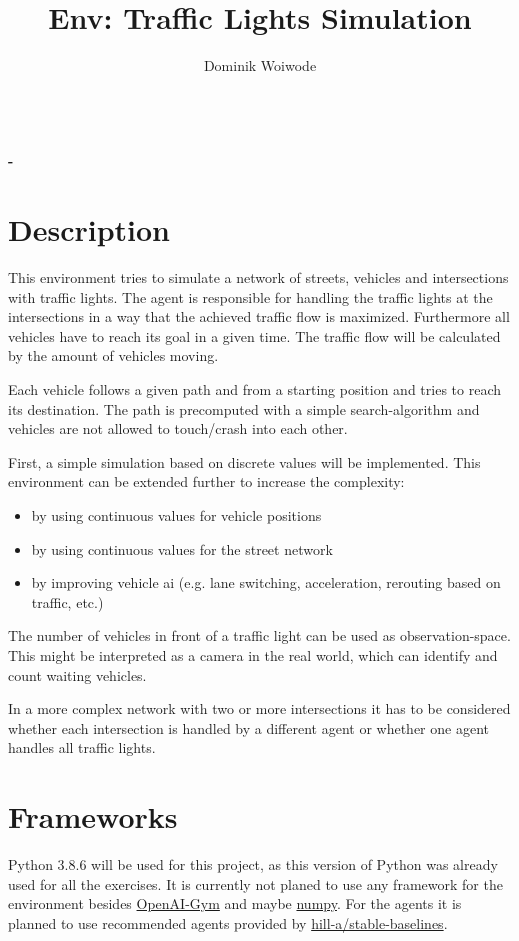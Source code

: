 \documentclass[11pt]{scrartcl}
\title{Env: Traffic Lights Simulation}
\author{Dominik Woiwode}
\begin{document}
    \begin{center}
        \makeatletter
        {\Huge\bfseries\@title}\\
        {\large\bfseries\@author \quad-\quad\@date}
        \makeatother
    \end{center}


    \section{Description}\label{sec:description}
    This environment tries to simulate a network of streets, vehicles and intersections with traffic lights.
    The agent is responsible for handling the traffic lights at the intersections in a way that the achieved traffic flow is maximized.
    Furthermore all vehicles have to reach its goal in a given time.
    The traffic flow will be calculated by the amount of vehicles moving.

    Each vehicle follows a given path and from a starting position and tries to reach its destination.
    The path is precomputed with a simple search-algorithm and vehicles are not allowed to touch/crash into each other.

    First, a simple simulation based on discrete values will be implemented.
    This environment can be extended further to increase the complexity:
    \begin{itemize}[noitemsep]
        \item by using continuous values for vehicle positions
        \item by using continuous values for the street network
        \item by improving vehicle ai (e.g. lane switching, acceleration, rerouting based on traffic, etc.)
    \end{itemize}

    The number of vehicles in front of a traffic light can be used as observation-space.
    This might be interpreted as a camera in the real world, which can identify and count waiting vehicles.

    In a more complex network with two or more intersections it has to be considered whether each intersection is handled by a different agent or whether one agent handles all traffic lights.


    \section{Frameworks}
    Python 3.8.6 will be used for this project, as this version of Python was already used for all the exercises.
    It is currently not planed to use any framework for the environment besides \href{https://gym.openai.com/}{OpenAI-Gym} and maybe \href{https://numpy.org/}{numpy}.
    For the agents it is planned to use recommended agents provided by \href{https://github.com/hill-a/stable-baselines}{hill-a/stable-baselines}.
\end{document}
